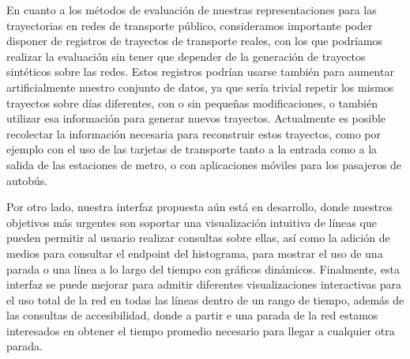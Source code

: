     En cuanto a los m\'etodos de evaluaci\'on de nuestras representaciones para las trayectorias en redes de transporte p\'ublico, consideramos importante poder disponer de registros de trayectos de transporte reales, con los que podr\'iamos realizar la evaluaci\'on sin tener que depender de la generaci\'on de trayectos sint\'eticos sobre las redes. Estos registros podr\'ian usarse tambi\'en para aumentar artificialmente nuestro conjunto de datos, ya que ser\'ia trivial repetir los mismos trayectos sobre d\'ias diferentes, con o sin peque\~nas modificaciones, o tambi\'en utilizar esa informaci\'on para generar nuevos trayectos. Actualmente es posible recolectar la informaci\'on necesaria para reconstruir estos trayectos, como por ejemplo con el uso de las tarjetas de transporte tanto a la entrada como a la salida de las estaciones de metro, o con aplicaciones m\'oviles para los pasajeros de autob\'us.

    Por otro lado, nuestra interfaz propuesta a\'un est\'a en desarrollo, donde nuestros objetivos m\'as urgentes son soportar una visualizaci\'on intuitiva de l\'ineas que pueden permitir al usuario realizar consultas sobre ellas, as\'i como la adici\'on de medios para consultar el endpoint del histograma, para mostrar el uso de una parada o una l\'inea a lo largo del tiempo con gr\'aficos din\'amicos. Finalmente, esta interfaz se puede mejorar para admitir diferentes visualizaciones interactivas para el uso total de la red en todas las l\'ineas dentro de un rango de tiempo, adem\'as de las consultas de accesibilidad, donde a partir e una parada de la red estamos interesados en obtener el tiempo promedio necesario para llegar a cualquier otra parada.